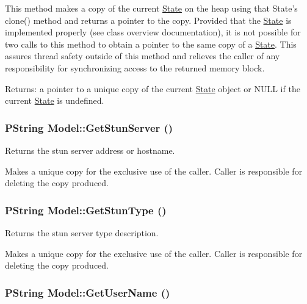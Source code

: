 This method makes a copy of the current \hyperlink{classState}{State} on the heap using that State's clone() method and returns a pointer to the copy. Provided that the \hyperlink{classState}{State} is implemented properly (see class overview documentation), it is not possible for two calls to this method to obtain a pointer to the same copy of a \hyperlink{classState}{State}. This assures thread safety outside of this method and relieves the caller of any responsibility for synchronizing access to the returned memory block.  \begin{Desc}
\item[Returns:]a pointer to a unique copy of the current \hyperlink{classState}{State} object or NULL if the current \hyperlink{classState}{State} is undefined. \end{Desc}
\hypertarget{classModel_8011462d91a258e49920db3b157c7af6}{
\subsubsection[{GetStunServer}]{\setlength{\rightskip}{0pt plus 5cm}PString Model::GetStunServer ()}}
\label{classModel_8011462d91a258e49920db3b157c7af6}


Returns the stun server address or hostname. 

Makes a unique copy for the exclusive use of the caller. Caller is responsible for deleting the copy produced. \hypertarget{classModel_6c040c5501c12f31f260280ea872b0b4}{
\subsubsection[{GetStunType}]{\setlength{\rightskip}{0pt plus 5cm}PString Model::GetStunType ()}}
\label{classModel_6c040c5501c12f31f260280ea872b0b4}


Returns the stun server type description. 

Makes a unique copy for the exclusive use of the caller. Caller is responsible for deleting the copy produced. \hypertarget{classModel_18c1848740876abd9544c870c6665879}{
\subsubsection[{GetUserName}]{\setlength{\rightskip}{0pt plus 5cm}PString Model::GetUserName ()}}
\label{classModel_18c1848740876abd9544c870c6665879}


